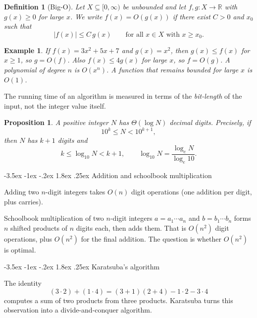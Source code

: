 \documentclass[11pt]{article}
\makeatletter
\renewcommand{\subsection}{\@startsection{subsection}{2}{\z@}%
    {-3.5ex \@plus -1ex \@minus -.2ex}%
    {1.8ex \@plus .25ex}%
    {\normalfont\large\bfseries}}
\newtheorem{proposition}[theorem]{Proposition}
\newtheorem{definition}[theorem]{Definition}
\newtheorem{example}[theorem]{Example}
\theoremstyle{remark}
\newcommand{\R}{\mathbb R}
\makeatother
\begin{document}
\begin{definition}[Big-O]
Let $X\subseteq [0,\infty)$ be unbounded and let $f,g\colon X\to\R$ with
$g(x)\ge 0$ for large $x$.
We write $f(x)=O(g(x))$ if there exist $C>0$ and $x_0$ such that
\[
    \bigl|f(x)\bigr| \le C\, g(x)
    \qquad\text{for all }x\in X\text{ with }x\ge x_0.
\]
\end{definition}

\begin{example}
If $f(x)=3x^2+5x+7$ and $g(x)=x^2$, then $g(x)\le f(x)$ for $x\ge 1$, so
$g=O(f)$. Also $f(x)\le 4g(x)$ for large $x$, so $f=O(g)$. A polynomial
of degree $n$ is $O(x^n)$. A function that remains bounded for large $x$
is $O(1)$.
\end{example}

The running time of an algorithm is measured in terms of the
\emph{bit-length} of the input, not the integer value itself.

\begin{proposition}
A positive integer $N$ has $\Theta(\log N)$ decimal digits. Precisely, if
\[
    10^k \le N < 10^{k+1},
\]
then $N$ has $k+1$ digits and
\[
    k \le \log_{10} N < k+1,
    \qquad
    \log_{10} N = \frac{\log_e N}{\log_e 10}.
\]
\end{proposition}

\subsection{Addition and schoolbook multiplication}

Adding two $n$-digit integers takes $O(n)$ digit operations (one
addition per digit, plus carries).

Schoolbook multiplication of two $n$-digit integers $a=a_1\cdots a_n$ and
$b=b_1\cdots b_n$ forms $n$ shifted products of $n$ digits each, then
adds them. That is $O(n^2)$ digit operations, plus $O(n^2)$ for the
final addition. The question is whether $O(n^2)$ is optimal.

\subsection{Karatsuba's algorithm}

The identity
\[
    (3\cdot 2)+(1\cdot 4)
    =
    (3+1)(2+4) - 1\cdot 2 - 3\cdot 4
\]
computes a sum of two products from three products. Karatsuba turns this
observation into a divide-and-conquer algorithm.
\end{document}
